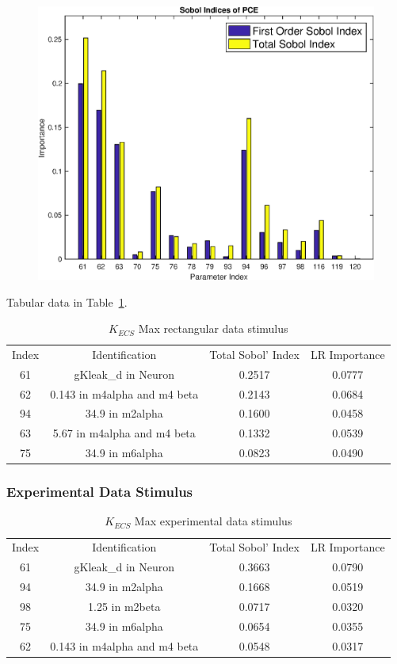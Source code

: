 \documentclass[12pt]{article}
\numberwithin{equation}{section}
\begin{document}
\begin{figure}[h]
\includegraphics[width=.49 \textwidth]{Figures/K_ECS_Max_QoI_PCE_SI_Rectangular.eps}
\end{figure}

Tabular data in Table~\ref{K_ECS_Max_rec}.

\begin{table}[h]
\centering
\begin{tabular}{cccc}
Index & Identification & Total Sobol' Index & LR Importance \\
61 & gKleak\_d in Neuron & 0.2517 & 0.0777\\
62 & 0.143 in m4alpha and m4 beta & 0.2143 & 0.0684\\
94 & 34.9 in m2alpha & 0.1600 & 0.0458\\
63 & 5.67 in m4alpha and m4 beta & 0.1332 & 0.0539\\
75 & 34.9 in m6alpha & 0.0823 & 0.0490\\
\end{tabular}
\caption{$K_{ECS}$ Max rectangular data stimulus}
\label{K_ECS_Max_rec}
\end{table}

\newpage

\subsubsection{Experimental Data Stimulus}

\begin{table}[h]
\centering
\begin{tabular}{cccc}
Index & Identification & Total Sobol' Index & LR Importance \\
61 & gKleak\_d in Neuron &  0.3663 &0.0790\\
94 & 34.9 in m2alpha & 0.1668 &0.0519\\
98 & 1.25 in m2beta & 0.0717 &0.0320\\
75 & 34.9 in m6alpha & 0.0654 &0.0355\\
62 & 0.143 in m4alpha and m4 beta & 0.0548 &0.0317\\
\end{tabular}
\caption{$K_{ECS}$ Max experimental data stimulus}
\label{K_ECS_Max_ex}
\end{table}
\end{document}
